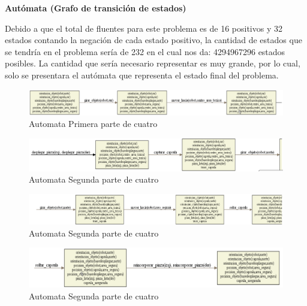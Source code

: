 \documentclass[letterpaper ,10pt]{article}
\begin{document}
{{\newpage


\centerline {\Huge\sffamily\textbf{Autómata (Grafo de transición de estados)  }}
\vspace{0.5cm}
\noindent Debido a que el total de fluentes para este problema es de 16 positivos y 32 estados contando la negación de cada estado positivo, la cantidad de estados que se tendría en el problema sería de 232 en el cual nos da: 4294967296 estados posibles. La cantidad que sería necesario representar es muy grande, por lo cual, solo se presentara el autómata que representa el estado final del problema.

\begin{figure}[htb]
\hspace*{-4cm} \includegraphics[width=1.7\textwidth]{g1}
\caption{Automata Primera parte de cuatro }
\end{figure}

\begin{figure}[htb]
\hspace*{-4.5cm} \includegraphics[width=1.7\textwidth]{g2}
\caption{Automata Segunda parte de cuatro }
\end{figure}

\begin{figure}[htb]
\hspace*{-4.5cm} \includegraphics[width=1.7\textwidth]{g3}
\caption{Automata Segunda parte de cuatro }
\end{figure}

\begin{figure}[htb]
\hspace*{-3cm} \includegraphics[width=1.5\textwidth]{g4}
\caption{Automata Segunda parte de cuatro }
\end{figure}

}}
\end{document}
